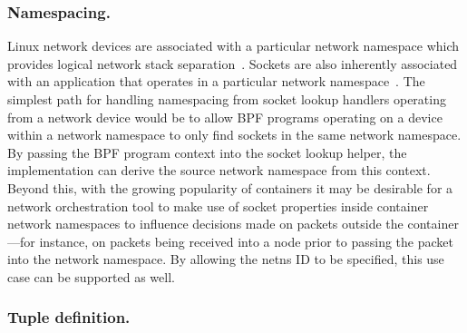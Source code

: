 \documentclass[10pt,sigconf,authorversion]{lpc}
\begin{document}




\subsubsection{Namespacing.}

Linux network devices are associated with a particular network namespace which
provides logical network stack separation~\cite{netns, netns-netdevice}.
Sockets are also inherently associated with an application that operates in a
particular network namespace~\cite{netns-sock}. The simplest path for handling
namespacing from socket lookup handlers operating from a network device would
be to allow BPF programs operating on a device within a network namespace to
only find sockets in the same network namespace. By passing the BPF program
context into the socket lookup helper, the implementation can derive the source
network namespace from this context. Beyond this, with the growing popularity
of containers it may be desirable for a network orchestration tool to make use
of socket properties inside container network namespaces to influence decisions
made on packets outside the container---for instance, on packets being received
into a node prior to passing the packet into the network namespace. By allowing
the netns ID to be specified, this use case can be supported as well.

\subsubsection{Tuple definition.}
\end{document}

